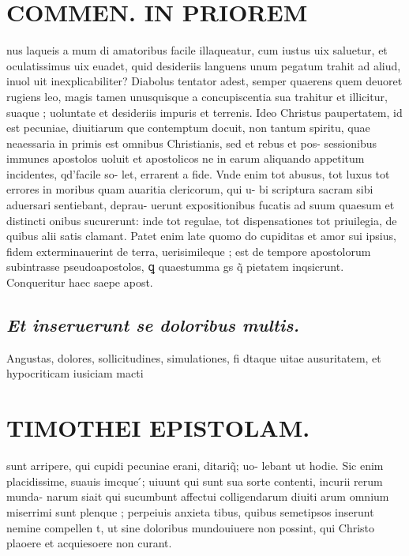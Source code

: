 \documentclass{article}
\begin{document}
\begin{pages}
\section*{COMMEN. IN PRIOREM }
\marginpar{[ p.166 ]}\pstart nus laqueis a mum di amatoribus facile illaqueatur, cum iustus uix saluetur, et oculatissimus uix euadet, quid desideriis languens unum pegatum trahit ad aliud, inuol uit inexplicabiliter? Diabolus tentator adest, semper quaerens quem deuoret rugiens leo, magis tamen unusquisque a concupiscentia sua trahitur et illicitur, suaque ; uoluntate et desideriis impuris et terrenis. Ideo Christus paupertatem, id est pecuniae, diuitiarum que contemptum docuit, non tantum spiritu, quae neaessaria in primis est omnibus Christianis, sed et rebus et pos- sessionibus immunes apostolos uoluit et apostolicos ne in earum aliquando appetitum incidentes, qd'facile so- let, errarent a fide. Vnde enim tot abusus, tot luxus tot errores in moribus quam auaritia clericorum, qui u- bi scriptura sacram sibi aduersari sentiebant, deprau- uerunt expositionibus fucatis ad suum quaesum et distincti onibus sucurerunt: inde tot regulae, tot dispensationes tot priuilegia, de quibus alii satis clamant. Patet enim late quomo do cupiditas et amor sui ipsius, fidem exterminauerint de terra, uerisimileque ; est de tempore apostolorum subintrasse pseudoapostolos, ꝗ quaestumma gs q̃ pietatem inqsicrunt. Conqueritur haec saepe apost.  \pend
{}
{}
\subsection*{\textit{Et inseruerunt se doloribus multis. }}\pstart Angustas, dolores, sollicitudines, simulationes, fi dtaque uitae ausuritatem, et hypocriticam iusiciam macti  \pend
\section*{TIMOTHEI EPISTOLAM. }
\marginpar{[ p.167 ]}\pstart sunt arripere, qui cupidi pecuniae erani, ditariq̃; uo- lebant ut hodie. Sic enim placidissime, suauis imcque ́; uiuunt qui sunt sua sorte contenti, incurii rerum munda- narum siait qui sucumbunt affectui colligendarum diuiti arum omnium miserrimi sunt plenque ; perpeiuis anxieta tibus, quibus semetipsos inserunt nemine compellen t, ut sine doloribus mundouiuere non possint, qui Christo plaoere et acquiesoere non curant.  \pend
{}
{}

\end{pages}
\end{document}
